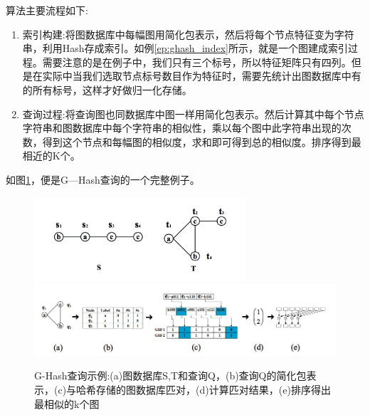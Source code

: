 \documentclass{XDBAthesis}
\begin{document}
算法主要流程如下:
\begin{enumerate}
    \item 索引构建:将图数据库中每幅图用简化包表示，然后将每个节点特征变为字符串，利用Hash存成索引。如例\ref{ep:ghash_index}所示，就是一个图建成索引过程。需要注意的是在例子中，我们只有三个标号，所以特征矩阵只有四列。但是在实际中当我们选取节点标号数目作为特征时，需要先统计出图数据库中有的所有标号，这样才好做归一化存储。
    \item 查询过程:将查询图也同数据库中图一样用简化包表示。然后计算其中每个节点字符串和图数据库中每个字符串的相似性，乘以每个图中此字符串出现的次数，得到这个节点和每幅图的相似度，求和即可得到总的相似度。排序得到最相近的K个。    
\end{enumerate}

如图\ref{fg:gHashExample}，便是G—Hash查询的一个完整例子。
\begin{figure}[htb]
    \centering
    \includegraphics[width=0.7\textwidth ]{../figures/ghashdatabase}
    \includegraphics[width=\textwidth ]{../figures/gHash+}
    \caption{G-Hash查询示例:(a)图数据库{S,T}和查询Q，(b)查询Q的简化包表示，(c)与哈希存储的图数据库匹对，(d)计算匹对结果，(e)排序得出最相似的k个图}
    \label{fg:gHashExample}
\end{figure}
\end{document}
